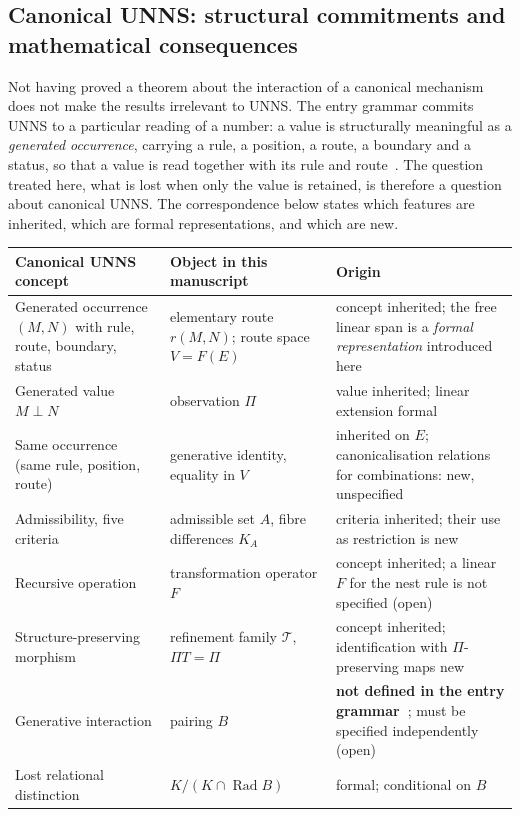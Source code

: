 \documentclass[11pt,a4paper]{article}
\newcommand{\Rad}{\operatorname{Rad}}
\theoremstyle{plain}
\theoremstyle{definition}
\begin{document}
\subsection{Canonical UNNS: structural commitments and mathematical consequences}\label{sec:canon}
Not having proved a theorem about the interaction of a canonical mechanism does not make the results irrelevant to UNNS. The entry grammar commits UNNS to a particular reading of a number: a value is structurally meaningful as a \emph{generated occurrence}, carrying a rule, a position, a route, a boundary and a status, so that a value is read together with its rule and route~\cite{G11,G12}. The question treated here, what is lost when only the value is retained, is therefore a question about canonical UNNS. The correspondence below states which features are inherited, which are formal representations, and which are new.
\begin{center}\small
\begin{tabularx}{\textwidth}{@{}>{\raggedright\arraybackslash}p{}>{\raggedright\arraybackslash}p{}>{\raggedright\arraybackslash}X@{}}
\toprule
Canonical UNNS concept & Object in this manuscript & Origin\\
\midrule
Generated occurrence $(M,N)$ with rule, route, boundary, status & elementary route $r(M,N)$; route space $V=F(E)$ & concept inherited; the free linear span is a \emph{formal representation} introduced here\\
Generated value $M\perp N$ & observation $\Pi$ & value inherited; linear extension formal\\
Same occurrence (same rule, position, route) & generative identity, equality in $V$ & inherited on $E$; canonicalisation relations for combinations: new, unspecified\\
Admissibility, five criteria & admissible set $A$, fibre differences $K_A$ & criteria inherited; their use as restriction is new\\
Recursive operation & transformation operator $F$ & concept inherited; a linear $F$ for the nest rule is not specified (open)\\
Structure-preserving morphism & refinement family $\mathcal T$, $\Pi T=\Pi$ & concept inherited; identification with $\Pi$-preserving maps new\\
Generative interaction & pairing $B$ & \textbf{not defined in the entry grammar~\cite{G11}}; must be specified independently (open)\\
Lost relational distinction & $K/(K\cap\Rad B)$ & formal; conditional on $B$\\
\bottomrule
\end{tabularx}
\end{center}
\end{document}
